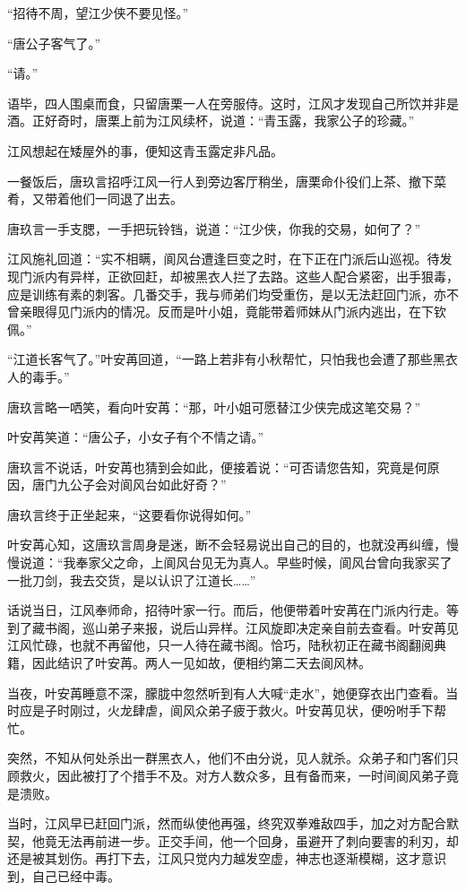 “招待不周，望江少侠不要见怪。”

“唐公子客气了。”

“请。”

语毕，四人围桌而食，只留唐栗一人在旁服侍。这时，江风才发现自己所饮并非是酒。正好奇时，唐栗上前为江风续杯，说道：“青玉露，我家公子的珍藏。”

江风想起在矮屋外的事，便知这青玉露定非凡品。

一餐饭后，唐玖言招呼江风一行人到旁边客厅稍坐，唐栗命仆役们上茶、撤下菜肴，又带着他们一同退了出去。

唐玖言一手支腮，一手把玩铃铛，说道：“江少侠，你我的交易，如何了？”

江风施礼回道：“实不相瞒，阆风台遭逢巨变之时，在下正在门派后山巡视。待发现门派内有异样，正欲回赶，却被黑衣人拦了去路。这些人配合紧密，出手狠毒，应是训练有素的刺客。几番交手，我与师弟们均受重伤，是以无法赶回门派，亦不曾亲眼得见门派内的情况。反而是叶小姐，竟能带着师妹从门派内逃出，在下钦佩。”

“江道长客气了。”叶安苒回道，“一路上若非有小秋帮忙，只怕我也会遭了那些黑衣人的毒手。”

唐玖言略一哂笑，看向叶安苒：“那，叶小姐可愿替江少侠完成这笔交易？”

叶安苒笑道：“唐公子，小女子有个不情之请。”

唐玖言不说话，叶安苒也猜到会如此，便接着说：“可否请您告知，究竟是何原因，唐门九公子会对阆风台如此好奇？”

唐玖言终于正坐起来，“这要看你说得如何。”

叶安苒心知，这唐玖言周身是迷，断不会轻易说出自己的目的，也就没再纠缠，慢慢说道：“我奉家父之命，上阆风台见无为真人。早些时候，阆风台曾向我家买了一批刀剑，我去交货，是以认识了江道长……”

话说当日，江风奉师命，招待叶家一行。而后，他便带着叶安苒在门派内行走。等到了藏书阁，巡山弟子来报，说后山异样。江风旋即决定亲自前去查看。叶安苒见江风忙碌，也就不再留他，只一人待在藏书阁。恰巧，陆秋初正在藏书阁翻阅典籍，因此结识了叶安苒。两人一见如故，便相约第二天去阆风林。

当夜，叶安苒睡意不深，朦胧中忽然听到有人大喊“走水”，她便穿衣出门查看。当时应是子时刚过，火龙肆虐，阆风众弟子疲于救火。叶安苒见状，便吩咐手下帮忙。

突然，不知从何处杀出一群黑衣人，他们不由分说，见人就杀。众弟子和门客们只顾救火，因此被打了个措手不及。对方人数众多，且有备而来，一时间阆风弟子竟是溃败。

当时，江风早已赶回门派，然而纵使他再强，终究双拳难敌四手，加之对方配合默契，他竟无法再前进一步。正交手间，他一个回身，虽避开了刺向要害的利刃，却还是被其划伤。再打下去，江风只觉内力越发空虚，神志也逐渐模糊，这才意识到，自己已经中毒。

